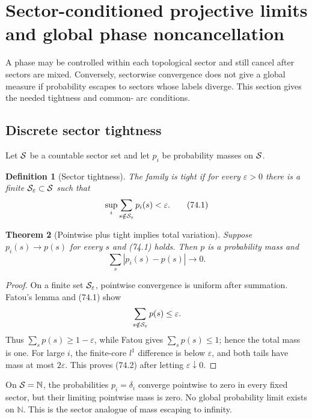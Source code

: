 \documentclass[11pt]{article}
\newtheorem{theorem}{Theorem}[section]
\newtheorem{definition}[theorem]{Definition}
\begin{document}
\section{Sector-conditioned projective limits and global phase
noncancellation}
\label{sec:v11v74}

A phase may be controlled within each topological sector and still
cancel after sectors are mixed.  Conversely, sectorwise convergence
does not give a global measure if probability escapes to sectors whose
labels diverge.  This section gives the needed tightness and common-
arc conditions.

\subsection{Discrete sector tightness}

Let \({\cal S}\) be a countable sector set and let
\(p_i\) be probability masses on \({\cal S}\).

\begin{definition}[Sector tightness]
\label{def:v11v74-tight}
The family is tight if for every \(\varepsilon>0\) there is a finite
\({\cal S}_\varepsilon\subset{\cal S}\) such that
\[
                         \sup_i\sum_{s\notin{\cal S}_\varepsilon}
                                      p_i(s)<\varepsilon.      \tag{74.1}
\]
\end{definition}

\begin{theorem}[Pointwise plus tight implies total variation]
\label{thm:v11v74-probability}
Suppose \(p_i(s)\to p(s)\) for every \(s\) and (74.1) holds.  Then
\(p\) is a probability mass and
\[
                              \sum_s|p_i(s)-p(s)|\longrightarrow0.
                                                                  \tag{74.2}
\]
\end{theorem}

\begin{proof}
On a finite set \({\cal S}_\varepsilon\), pointwise convergence is
uniform after summation.  Fatou's lemma and (74.1) show
\[
 \sum_{s\notin{\cal S}_\varepsilon}p(s)\le\varepsilon.
\]
Thus \(\sum_sp(s)\ge1-\varepsilon\), while Fatou gives
\(\sum_sp(s)\le1\); hence the total mass is one.  For large \(i\), the
finite-core \(l^1\) difference is below \(\varepsilon\), and both
tails have mass at most \(2\varepsilon\).  This proves (74.2) after
letting \(\varepsilon\downarrow0\).
\end{proof}

\begin{warning}
\label{warn:v11v74-escape}
On \({\cal S}=\mathbb N\), the probabilities \(p_i=\delta_i\) converge
pointwise to zero in every fixed sector, but their limiting pointwise
mass is zero.  No global probability limit exists on \(\mathbb N\).
This is the sector analogue of mass escaping to infinity.
\end{warning}
\end{document}
